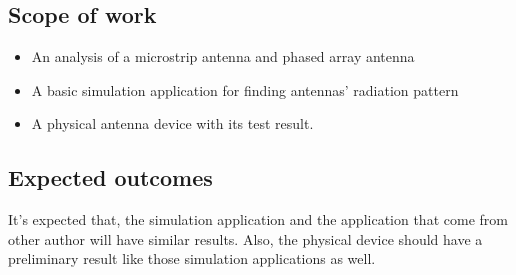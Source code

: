 \documentclass[11pt,a4paper]{article}
\begin{document}
    \subsection{Scope of work}
      \begin{itemize}
        \item An analysis of a microstrip antenna and phased array antenna
        \item A basic simulation application for finding antennas' radiation pattern
        \item A physical antenna device with its test result.
      \end{itemize}

    \subsection{Expected outcomes}
      \indent It's expected that, the simulation application and the application that come from other author
      will have similar results. Also, the physical device should have a preliminary result like those simulation
      applications as well.
    
    \subsection{}
  
    \newpage

   
  
\end{document}
